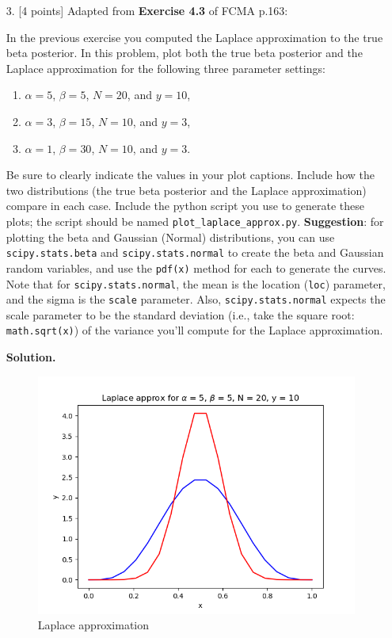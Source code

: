 \documentclass[10pt]{article}
\begin{document}
\begin{itemize}
\item[3.]  [4 points]
Adapted from {\bf Exercise 4.3} of FCMA p.163:

In the previous exercise you computed the Laplace approximation to the true beta posterior.  In this problem, plot both the true beta posterior and the Laplace approximation for the following three parameter settings:
\begin{enumerate}
\item $\alpha = 5$, $\beta = 5$, $N = 20$, and $y = 10$,
\item $\alpha = 3$, $\beta = 15$, $N = 10$, and $y = 3$,
\item $\alpha = 1$, $\beta = 30$, $N = 10$, and $y = 3$.
\end{enumerate}
Be sure to clearly indicate the values in your plot captions.  Include how the two distributions (the true beta posterior and the Laplace approximation) compare in each case.  Include the python script you use to generate these plots; the script should be named {\tt plot\_laplace\_approx.py}.  {\bf Suggestion}: for plotting the beta and Gaussian (Normal) distributions, you can use {\tt scipy.stats.beta} and {\tt scipy.stats.normal} to create the beta and Gaussian random variables, and use the {\tt pdf(x)} method for each to generate the curves.  Note that for {\tt scipy.stats.normal}, the mean is the location ({\tt loc}) parameter, and the sigma is the {\tt scale} parameter.  Also, {\tt scipy.stats.normal} expects the scale parameter to be the standard deviation (i.e., take the square root: {\tt math.sqrt(x)}) of the variance you'll compute for the Laplace approximation.


{\bf Solution.}

\begin{figure}[H]
\centering
  \includegraphics[width=\linewidth]{laplace1.png}
 \caption{Laplace approximation}
\label{label}
\end{figure}


\end{itemize}
\end{document}
